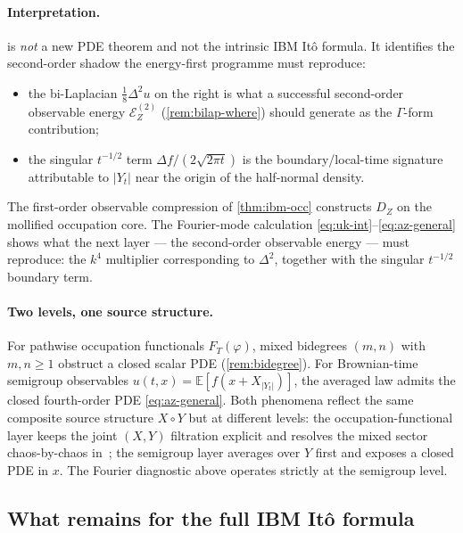 \documentclass[11pt,reqno]{amsart}
\theoremstyle{plain}
\theoremstyle{definition}
\theoremstyle{remark}
\newcommand{\E}{\mathbb{E}}
\newcommand{\Energy}{\mathcal{E}}
\newcommand{\IBM}{Z}
\newcommand{\Carre}{\Gamma}
\begin{document}
\paragraph{Interpretation.}
 is \emph{not} a new PDE theorem and not the
intrinsic IBM It\^o formula. It identifies the second-order shadow the
energy-first programme must reproduce:
\begin{itemize}
\item the bi-Laplacian $\tfrac18\Delta^{2}u$ on the right is what a
  successful second-order observable energy
  $\Energy_\IBM^{(2)}$ (\cref{rem:bilap-where}) should generate as the
  $\Carre$-form contribution;
\item the singular $t^{-1/2}$ term $\Delta f/(2\sqrt{2\pi t})$ is the
  boundary/local-time signature attributable to $|Y_t|$ near the origin
  of the half-normal density.
\end{itemize}
The first-order observable compression of \cref{thm:ibm-occ}
constructs $D_\IBM$ on the mollified occupation core. The
Fourier-mode calculation \eqref{eq:uk-int}--\eqref{eq:az-general}
shows what the next layer --- the second-order observable energy ---
must reproduce: the $k^{4}$ multiplier corresponding to $\Delta^{2}$,
together with the singular $t^{-1/2}$ boundary term.

\paragraph{Two levels, one source structure.}
For pathwise occupation functionals $F_T(\varphi)$, mixed bidegrees
$(m,n)$ with $m,n\ge 1$ obstruct a closed scalar PDE
(\cref{rem:bidegree}). For Brownian-time semigroup observables
$u(t,x)=\E[f(x+X_{|Y_t|})]$, the averaged law admits the closed
fourth-order PDE \eqref{eq:az-general}. Both phenomena reflect the
same composite source structure $X\circ Y$ but at different levels:
the occupation-functional layer keeps the joint $(X,Y)$ filtration
explicit and resolves the mixed sector chaos-by-chaos
in~\cite{Fontes-IBMchaos}; the semigroup layer averages over $Y$ first
and exposes a closed PDE in $x$. The Fourier diagnostic above operates
strictly at the semigroup level.

\subsection*{What remains for the full IBM It\^o formula}
\end{document}
